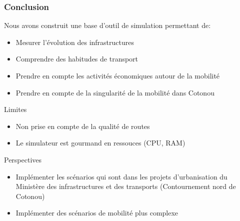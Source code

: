 \begin{frame}
    \frametitle{Conclusion}
        Nous avons construit une base d'outil de simulation permettant de:
    \begin{itemize}
        \item {} Mesurer l'évolution des infrastructures
        \item {} Comprendre des habitudes de transport
        \item {} Prendre en compte les activités économiques autour de la mobilité
        \item {} Prendre en compte de la singularité de la mobilité dans Cotonou
    \end{itemize}


    \begin{alertblock}{Limites}
        \begin{itemize}
            \item Non prise en compte de la qualité de routes
            \item Le simulateur est gourmand en ressouces (CPU, RAM)
        \end{itemize}
    \end{alertblock}

    \begin{block}{Perspectives}
        \begin{itemize}
            \item Implémenter les scénarios qui sont dans les projets d'urbanisation du Ministère des infrastructures et des transports (Contournement nord de Cotonou)
            \item Implémenter des scénarios de mobilité plus complexe
        \end{itemize}
    \end{block}
\end{frame}

%

